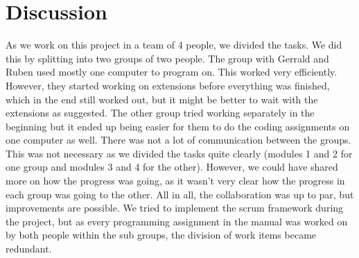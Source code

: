 \chapter{Discussion}

As we work on this project in a team of 4 people, we divided the tasks. We did this by splitting into two groups of two people. The group with Gerrald and Ruben used mostly one computer to program on. This worked very efficiently. However, they started working on extensions before everything was finished, which in the end still worked out, but it might be better to wait with the extensions as suggested.  The other group tried working separately in the beginning but it ended up being easier for them to do the coding assignments on one computer as well. There was not a lot of communication between the groups. This was not necessary as we divided the tasks quite clearly (modules 1 and 2 for one group and modules 3 and 4 for the other). However, we could have shared more on how the progress was going, as it wasn't very clear how the progress in each group was going to the other. All in all, the collaboration was up to par, but improvements are possible. We tried to implement the scrum framework during the project, but as every programming assignment in the manual was worked on by both people within the sub groups, the division of work items became redundant. 






